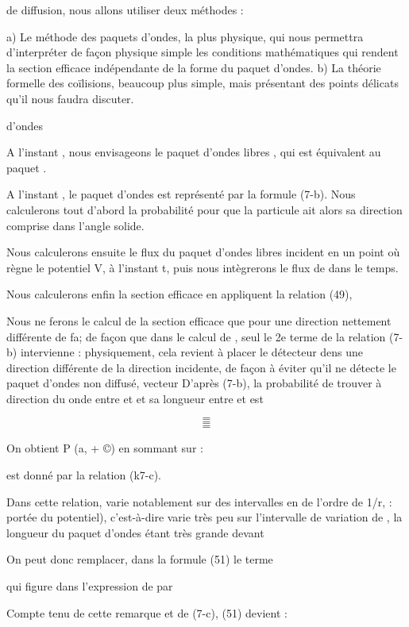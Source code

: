 de diffusion, nous allons utiliser deux méthodes :


a) Le méthode des paquets d'ondes, la plus physique, qui nous permettra
d'interpréter de façon physique simple les conditions mathématiques qui
rendent la section efficace indépendante de la forme du paquet d'ondes.
b) La théorie formelle des coïlisions, beaucoup plus simple, mais présentant des
points délicats qu'il nous faudra discuter.

d'ondes

A l'instant  , nous envisageons le paquet d'ondes libres , qui est équivalent au paquet .

A l'instant  , le paquet d'ondes est représenté par la
formule (7-b). Nous calculerons tout d'abord la probabilité 
pour que la particule ait alors sa direction comprise dans l'angle solide.

Nous calculerons ensuite le flux du paquet d'ondes libres incident en un point où
règne le potentiel V, à l'instant t, puis nous intègrerons le flux de  dans le temps.

Nous calculerons enfin la section efficace en appliquent la relation (49),

Nous ne ferons le calcul de la section efficace que pour une direction  nettement
différente de fa; de façon que dans le calcul de
, seul le 2e terme de la relation (7-b) intervienne : physiquement,
cela revient à placer le détecteur dens une direction différente de la direction
incidente, de façon à éviter qu'il ne détecte le paquet d'ondes non diffusé,
vecteur D'après (7-b), la probabilité de trouver à  direction du
onde entre  et  et sa longueur entre  et  est


\[
\tag{51}=
\]
\[
\tag{52}=
\]
\[
\tag{53}=
\]

On obtient P (a, + ©) en sommant sur  :

  est donné par la relation (k7-c).

Dans cette relation, varie notablement sur des intervalles en  de l'ordre
de 1/r,  : portée du potentiel), c'est-à-dire
varie très peu sur l'intervalle de variation de , la longueur
du paquet d'ondes étant très grande devant 

On peut donc remplacer, dans la formule (51) le terme

 qui figure dans l'expression de  par

Compte tenu de cette remarque et de (7-c), (51) devient :

